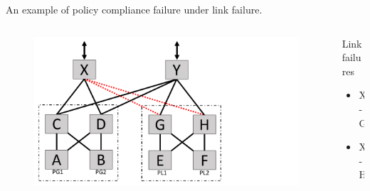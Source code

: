 \begin{frame}{An example of policy compliance failure under link failure.}
    \begin{columns}
        \begin{column}{0.45\textwidth}
            \begin{figure}
                \includegraphics[width=1\textwidth,keepaspectratio,clip,trim={0cm 0cm 9cm 0cm}]{figures/ex2_1_failed_links.pdf}
            \end{figure}
        \end{column}
        \begin{column}{0.50\textwidth}
            \begin{block}{Link failures}
                \begin{itemize}
                    \item X-G
                    \item X-H
                \end{itemize}
            \end{block}
        \end{column}
    \end{columns}
\end{frame}

